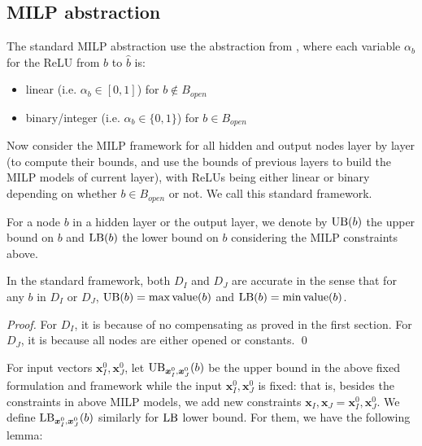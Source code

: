 				
				\subsection{MILP abstraction}
				
				The standard MILP abstraction use the abstraction from \cite{MILP}, 
				where each variable $\alpha_b$ for the ReLU from $b$ to $\hat{b}$ is:
				\begin{itemize}
					\item linear  (i.e. $\alpha_b \in [0,1]$) for $b \notin B_{open}$
					\item binary/integer (i.e. $\alpha_b \in \{0,1\}$) for $b \in B_{open}$
				\end{itemize}
				
				Now consider the MILP framework for all hidden and output nodes layer by layer (to compute their bounds, and use the bounds of previous layers to build the MILP models of current layer), with ReLUs being either linear or binary depending on whether $b \in B_{open}$ or not. We call this standard framework.
				
				For a node $b$ in a hidden layer or the output layer, we denote by $\mathrm{UB}(b)$ the upper bound on $b$ and $\mathrm{LB}(b)$ the lower bound on $b$ considering the MILP constraints above.
				
				
				\begin{lemma}
					In the standard framework, both $D_I$ and $D_J$ are accurate in the sense that for any $b$ in $D_I$ or $D_J$, $\mathrm{UB}(b)=\max{\textrm{value}}(b)$ and $\mathrm{LB}(b)=\min{\textrm{value}}(b)$.
				\end{lemma}
				
				\begin{proof}
					For $D_I$, it is because of no compensating as proved in the first section. For $D_J$, it is because all nodes are either opened or constants. \qed
				\end{proof}
				
				
				
				
				For input vectors $\boldsymbol{x}^0_I,\boldsymbol{x}^0_J$, let $\mathrm{UB}_{\boldsymbol{x}^0_I,\boldsymbol{x}^0_J}(b)$ be the upper bound in the above fixed formulation and framework while the input $\boldsymbol{x}^0_I,\boldsymbol{x}^0_J$ is fixed: that is, besides the constraints in above MILP models, we add new constraints $\boldsymbol{x}_I,\boldsymbol{x}_J=\boldsymbol{x}^0_I,\boldsymbol{x}^0_J$. We  define $\mathrm{LB}_{\boldsymbol{x}^0_I,\boldsymbol{x}^0_J}(b)$ similarly for $\mathrm{LB}$ lower bound. For them, we have the following lemma:
				
